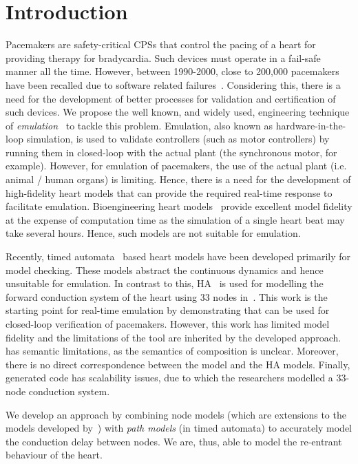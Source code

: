 \section{Introduction}

Pacemakers are safety-critical \acp{CPS} 
that control the pacing of a heart for providing therapy for bradycardia.
Such devices must operate in a fail-safe manner all the time.
However, between 1990-2000, close to 200,000 pacemakers have been recalled
due to software related failures~\cite{alemzadeh13}. Considering this,
 there is a need for the development of better processes for validation and 
certification of such devices. We propose the well known, and widely 
used, engineering technique of \emph{emulation}~\cite{patel2015survey}
 to tackle this problem. Emulation, also known as  hardware-in-the-loop simulation,
 is used to validate controllers (such as motor controllers) by running them in closed-loop
with the actual plant (the synchronous motor, for example). 
However, for emulation of pacemakers, the use of the actual plant (i.e. animal / human organs) is limiting.
Hence, there is a need for the development of high-fidelity heart models that 
 can provide the required real-time response to facilitate emulation. Bioengineering heart models~\cite{Trayanova2014}
 provide excellent model fidelity at the expense of computation time as the simulation of a single heart beat may take 
several hours. Hence, such models are not suitable for emulation.

Recently, timed automata~\cite{zhihao12} based heart models have been 
 developed primarily for model checking. These models 
abstract the continuous dynamics and hence unsuitable for emulation. 
In contrast to this, \acf{HA}~\cite{alur2015principles, raskin05} is used for modelling the forward conduction system
of the heart using 33 nodes in~\cite{chen14}. This work is the  starting point 
for real-time emulation by demonstrating that \simulink can be used for 
 closed-loop verification of pacemakers. However, this work has limited model 
fidelity and the limitations of the tool \simulink are inherited by the developed approach.
\simulink has semantic limitations, as the semantics of composition is unclear.
Moreover, there is no direct correspondence between the \simulink model and 
the \ac{HA}  models. Finally, \simulink generated code has scalability issues, due to which 
the researchers modelled a 33-node conduction system.

We develop an approach by combining node models (which are
extensions to the models developed by~\cite{chen14}) with 
 \emph{path models} (in timed automata) to accurately 
model the conduction delay between nodes. We are, thus, able to 
model the re-entrant behaviour of the heart. 

